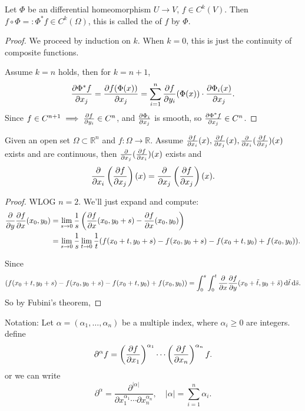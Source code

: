 \begin{theorem}
    Let $\Phi$ be an differential homeomorphism $U\to V$, $f\in C^k(V)$.
	Then $f \circ \Phi =: \Phi^* f\in C^k(\Omega)$, this is called
	the  of $f$ by $\Phi$.
\end{theorem}
\begin{proof}[Proof]
    We proceed by induction on $k$.
	When $k = 0$, this is just the continuity of composite functions.

	Assume $k = n$ holds, then for $k = n+1$,
	\[
	\frac{\partial \Phi^*f}{\partial x_j} = \frac{\partial f(\Phi(x))}{\partial x_j}
	= \sum_{i=1}^{n} \frac{\partial f}{\partial y_i}(\Phi(x)) \cdot \frac{\partial \Phi_i(x)}{\partial x_j}.
	\]
	Since $f \in C^{n+1}\implies \frac{\partial f}{\partial y_i}\in C^n$,
	and $\frac{\partial \Phi_i}{\partial x_j}$ is smooth, so $\frac{\partial \Phi^*f}{\partial x_j}\in C^n$.
\end{proof}

\begin{theorem}
    Given an open set $\Omega \subset \mathbb{R}^{n}$ and $f: \Omega\to \mathbb{R}$.
	Assume $\frac{\partial f}{\partial x_i}(x), \frac{\partial f}{\partial x_j}(x), \frac{\partial }{\partial x_i}(\frac{\partial f}{\partial x_j})(x)$ exists
	and are continuous, then
	$\frac{\partial }{\partial x_j}(\frac{\partial f}{\partial x_i})(x)$ exists and
	\[
	\frac{\partial }{\partial x_i}\left(\frac{\partial f}{\partial x_j}\right)(x)
	= \frac{\partial }{\partial x_j}\left(\frac{\partial f}{\partial x_j}\right)(x).
	\]
\end{theorem}
\begin{proof}[Proof]
    WLOG $n = 2$.
	We'll just expand and compute:
	\begin{align*}
	    \frac{\partial }{\partial y}\frac{\partial f}{\partial x}(x_0, y_0)
		&= \lim_{s\to 0}\frac{1}{s}
		\left(\frac{\partial f}{\partial x}(x_0,y_0+s) - \frac{\partial f}{\partial x}(x_0,y_0)\right)\\
		&= \lim_{s\to 0}\frac{1}{s} \lim_{t\to 0} \frac{1}{t}
		(f(x_0+t, y_0+s) - f(x_0, y_0+s) - f(x_0+t, y_0) + f(x_0,y_0)).
	\end{align*}

	Since
	\[
		(f(x_0+t, y_0+s) - f(x_0, y_0+s) - f(x_0+t, y_0) + f(x_0,y_0))
		= \int_{0}^{s} \int_{0}^{t} \frac{\partial }{\partial x}\frac{\partial f}{\partial y}
		(x_0+\tilde t,y_0+\tilde s)\mathop{}\!\mathrm{d} \tilde t\mathop{}\!\mathrm{d} \tilde s.
	\]
	So by Fubini's theorem,
\end{proof}

Notation:
Let $\alpha = (\alpha_1,\dots,\alpha_n)$ be a multiple index,
where $\alpha_i\ge 0$ are integers.
define
\[
\partial^\alpha f = \left(\frac{\partial f}{\partial x_1}\right)^{\alpha_1}\cdots
\left(\frac{\partial f}{\partial x_n}\right)^{\alpha_n}f.
\]
or we can write
\[
\partial^\alpha = \frac{\partial^{|\alpha|}}{\partial x_1^{\alpha_1}\cdots
\partial x_n^{\alpha_n}},\quad |\alpha| = \sum_{i=1}^{n} \alpha_i.
\]

